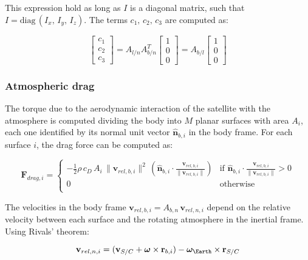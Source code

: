 This expression hold as long as $I$ is a diagonal matrix, such that $I = \text{diag}\,(I_x,\,I_y,\,I_z)$. The terms $c_1,\,c_2,\,c_3$ are computed as:

\begin{equation}
    \begin{bmatrix}
    c_1 \\
    c_2 \\
    c_3 
    \end{bmatrix}
    = A_{l/n} A_{b/n}^T
    \begin{bmatrix}
    1 \\
    0 \\
    0
    \end{bmatrix}
    = A_{b/l}
    \begin{bmatrix}
    1 \\
    0 \\
    0
    \end{bmatrix}
\end{equation}

\subsubsection{Atmospheric drag} \label{sec:drag}

The torque due to the aerodynamic interaction of the satellite with the atmosphere is computed dividing the body into $M$ planar surfaces with area $A_i$, each one identified by its normal unit vector $\hat{\mathbf{n}}_{b,i}$ in the body frame. For each surface $i$, the drag force can be computed as:

\begin{equation}
    \mathbf{F}_{drag,i} = 
    \begin{cases}
    - \frac{1}{2} \rho\,c_D \, A_{i} \, \| \mathbf{v}_{rel,b,i} \|^2 \, \left( \hat{\mathbf{n}}_{b,i} \cdot \frac{\mathbf{v}_{rel,b,i}}{\| \mathbf{v}_{rel,b,i} \|} \right) & \text{if } \hat{\mathbf{n}}_{b,i} \cdot \frac{\mathbf{v}_{rel,b,i}}{\| \mathbf{v}_{rel,b,i} \|} > 0 \\
    0 & \text{otherwise} \\
    \end{cases}
\end{equation}


The velocities in the body frame $\mathbf{v}_{rel,b,i} = A_{b,n}\, \mathbf{v}_{rel,n,i}$ depend on the relative velocity between each surface and the rotating atmosphere in the inertial frame. Using Rivals' theorem:

\begin{equation}
\mathbf{v}_{rel,n,i} = (\mathbf{v}_{S/C} + \bm{\omega} \times \mathbf{r}_{b,i}) - \bm{\omega}_{\Earth} \times \mathbf{r}_{S/C}    
\end{equation}

